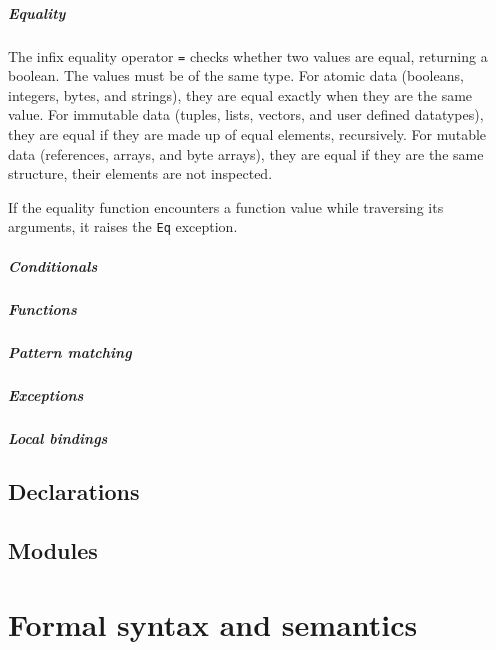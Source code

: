 \documentclass[12pt,a4paper]{book}
\begin{document}
\paragraph{Equality}

The infix equality operator \texttt{=} checks whether two values are equal, returning a boolean. The values must be of the same type. For atomic data (booleans, integers, bytes, and strings), they are equal exactly when they are the same value. For immutable data (tuples, lists, vectors, and user defined datatypes), they are equal if they are made up of equal elements, recursively. For mutable data (references, arrays, and byte arrays), they are equal if they are the same structure, their elements are not inspected.

If the equality function encounters a function value while traversing its arguments, it raises the \texttt{Eq} exception.

\paragraph{Conditionals}

\paragraph{Functions}

\paragraph{Pattern matching}

\paragraph{Exceptions}

\paragraph{Local bindings}

\section{Declarations}
\label{declarations}

\section{Modules}

\chapter{Formal syntax and semantics}
\end{document}
